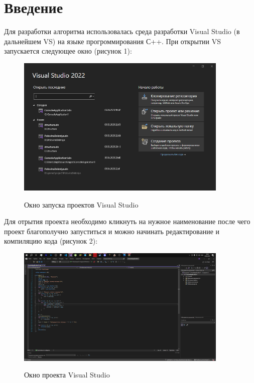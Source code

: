 \documentclass[14pt,a4paper]{scrartcl}
\begin{document}
\tableofcontents
\newpage
\section{Введение}
Для разработки алгоритма использовалась среда разработки Visual Studio (в дальнейшем VS) на языке прогроммирования С++. При открытии VS запускается следующее окно (рисунок 1):
\begin{figure}[h!]
    \centering
    \includegraphics [width=0.9\textwidth]{pic1}\\
    \caption{Окно запуска проектов Visual Studio}
    \label{fig:pic1}
\end{figure}

\newpage

Для отрытия проекта необходимо кликнуть на нужное наименование после чего проект благополучно запуститься и можно начинать редактирование и компиляцию кода (рисунок 2): 

\begin{figure}[h!]
    \centering
    \includegraphics [width=0.9\textwidth]{pic2}\\
    \caption{Окно проекта Visual Studio}
    \label{fig:pic2}
\end{figure}
\end{document}
